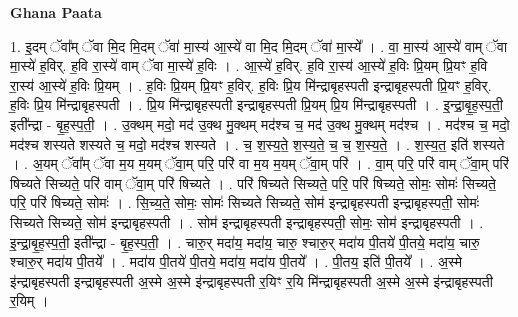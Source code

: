 \documentclass[17pt]{extarticle}
\begin{document}
\textbf{Ghana Paata } \newline

1. इ॒दम् ॅवा᳚म् ॅवा मि॒द मि॒दम् ॅवा॑ मा॒स्य॑ आ॒स्ये॑ वा मि॒द मि॒दम् ॅवा॑ मा॒स्ये᳚ । . वा॒ मा॒स्य॑ आ॒स्ये॑ वाम् ॅवा मा॒स्ये॑ ह॒विर्. ह॒वि रा॒स्ये॑ वाम् ॅवा मा॒स्ये॑ ह॒विः । . आ॒स्ये॑ ह॒विर्. ह॒वि रा॒स्य॑ आ॒स्ये॑ ह॒विः प्रि॒यम् प्रि॒यꣳ ह॒वि रा॒स्य॑ आ॒स्ये॑ ह॒विः प्रि॒यम् । . ह॒विः प्रि॒यम् प्रि॒यꣳ ह॒विर्. ह॒विः प्रि॒य मि॑न्द्राबृहस्पती इन्द्राबृहस्पती प्रि॒यꣳ ह॒विर्. ह॒विः प्रि॒य मि॑न्द्राबृहस्पती । . प्रि॒य मि॑न्द्राबृहस्पती इन्द्राबृहस्पती प्रि॒यम् प्रि॒य मि॑न्द्राबृहस्पती । . इ॒न्द्रा॒बृ॒ह॒स्प॒ती॒ इती᳚न्द्रा - बृ॒ह॒स्प॒ती॒ । . उ॒क्थम् मदो॒ मद॑ उ॒क्थ मु॒क्थम् मद॑श्च च॒ मद॑ उ॒क्थ मु॒क्थम् मद॑श्च । . मद॑श्च च॒ मदो॒ मद॑श्च शस्यते शस्यते च॒ मदो॒ मद॑श्च शस्यते । . च॒ श॒स्य॒ते॒ श॒स्य॒ते॒ च॒ च॒ श॒स्य॒ते॒ । . श॒स्य॒त॒ इति॑ शस्यते । . अ॒यम् ॅवा᳚म् ॅवा म॒य म॒यम् ॅवा॒म् परि॒ परि॑ वा म॒य म॒यम् ॅवा॒म् परि॑ । . वा॒म् परि॒ परि॑ वाम् ॅवा॒म् परि॑ षिच्यते सिच्यते॒ परि॑ वाम् ॅवा॒म् परि॑ षिच्यते । . परि॑ षिच्यते सिच्यते॒ परि॒ परि॑ षिच्यते॒ सोमः॒ सोमः॑ सिच्यते॒ परि॒ परि॑ षिच्यते॒ सोमः॑ । . सि॒च्य॒ते॒ सोमः॒ सोमः॑ सिच्यते सिच्यते॒ सोम॑ इन्द्राबृहस्पती इन्द्राबृहस्पती॒ सोमः॑ सिच्यते सिच्यते॒ सोम॑ इन्द्राबृहस्पती । . सोम॑ इन्द्राबृहस्पती इन्द्राबृहस्पती॒ सोमः॒ सोम॑ इन्द्राबृहस्पती । . इ॒न्द्रा॒बृ॒ह॒स्प॒ती॒ इती᳚न्द्रा - बृ॒ह॒स्प॒ती॒ । . चारु॒र् मदा॑य॒ मदा॑य॒ चारु॒ श्चारु॒र् मदा॑य पी॒तये॑ पी॒तये॒ मदा॑य॒ चारु॒ श्चारु॒र् मदा॑य पी॒तये᳚ । . मदा॑य पी॒तये॑ पी॒तये॒ मदा॑य॒ मदा॑य पी॒तये᳚ । . पी॒तय॒ इति॑ पी॒तये᳚ । . अ॒स्मे इ॑न्द्राबृहस्पती इन्द्राबृहस्पती अ॒स्मे अ॒स्मे इ॑न्द्राबृहस्पती र॒यिꣳ र॒यि मि॑न्द्राबृहस्पती अ॒स्मे अ॒स्मे इ॑न्द्राबृहस्पती र॒यिम् । \newline
\end{document}
